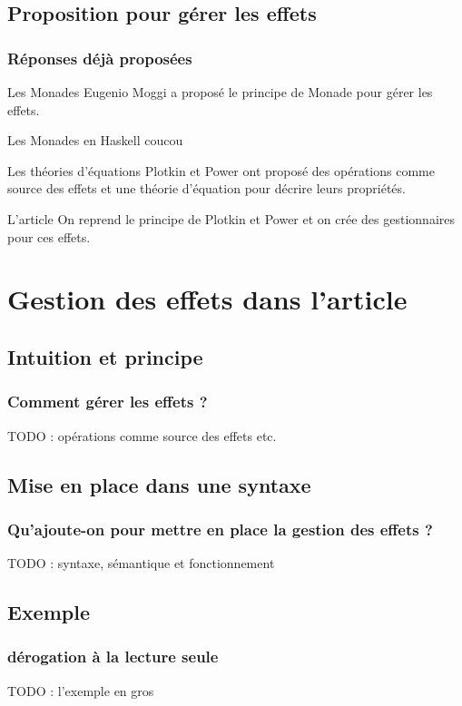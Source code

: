 \documentclass{beamer}
\begin{document}
\subsection{Proposition pour gérer les effets}
\begin{frame}
	\frametitle{Réponses déjà proposées}

	\begin{block}{Les Monades}
		Eugenio Moggi a proposé le principe de \alert{Monade} pour gérer les effets.
	\end{block}

	\begin{exampleblock}{Les Monades en Haskell}
		coucou
	\end{exampleblock}

	\begin{block}{Les théories d'équations}
		Plotkin et Power ont proposé des opérations comme source des effets et une
		\alert{théorie d'équation} pour décrire leurs propriétés.
	\end{block}

	\begin{block}{L'article}
		On reprend le principe de Plotkin et Power et on crée des gestionnaires 
		pour ces effets. 
	\end{block}
\end{frame}

\section{Gestion des effets dans l'article}

\subsection{Intuition et principe}
\begin{frame}
	\frametitle{Comment gérer les effets ?}
	TODO : opérations comme source des effets etc.
\end{frame}

\subsection{Mise en place dans une syntaxe}
\begin{frame}
	\frametitle{Qu'ajoute-on pour mettre en place la gestion des effets ?}
	TODO : syntaxe, sémantique et fonctionnement
\end{frame}

\subsection{Exemple}
\begin{frame}
	\frametitle{dérogation à la lecture seule}
	TODO : l'exemple en gros
\end{frame}
\end{document}
